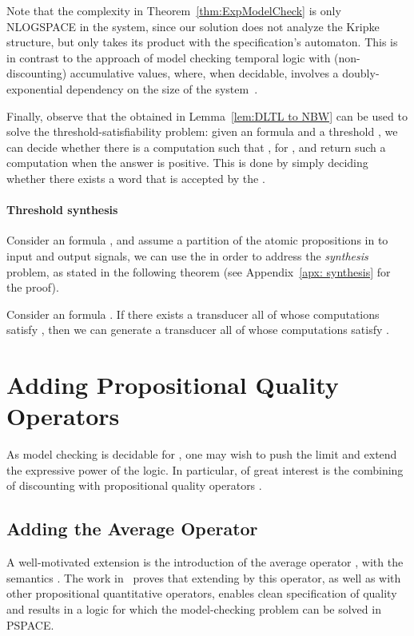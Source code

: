 \documentclass{llncs}
\begin{document}
Note that the complexity in Theorem~\ref{thm:ExpModelCheck} is 
only
NLOGSPACE in the system, since our solution does not analyze the Kripke structure, but only takes its product with the specification's automaton. This is in contrast to the approach of model checking temporal logic with (non-discounting) accumulative values, where, when decidable, involves a doubly-exponential dependency on the size of the system~\cite{BCHK11}.

Finally, observe that the  obtained in Lemma~\ref{lem:DLTL to NBW} can be used to solve the threshold-satisfiability problem: given an  formula  and a threshold , we can decide whether there is a computation  such that , for , and return such a computation when the answer is positive. This is done by simply deciding whether there exists a word that is accepted by the .


\paragraph{Threshold synthesis}
\label{rmk:SAT and synthesis}
Consider an  formula , and assume a partition of the atomic propositions in  to input and output signals, we can use the   in order to address the {\em synthesis} problem, as stated in the following theorem (see Appendix~\ref{apx: synthesis} for the proof).
\begin{theorem}
\label{thm:synthesis}
Consider an  formula . If there exists a transducer  all of whose computations  satisfy , then we can generate a transducer  all of whose computations  satisfy .
\end{theorem}




\section{Adding Propositional Quality Operators}
\label{sec:adding quality}

As model checking is decidable for , one may wish to push the limit and extend the expressive power of the logic. In particular, of great interest is the combining of discounting with propositional quality operators \cite{ABK13}.
\subsection{Adding the Average Operator}
\label{sec:average}
A well-motivated extension is the introduction of the average operator , with the semantics .
The work in~\cite{ABK13} proves that extending  by this operator, as well as with other propositional quantitative operators, enables clean specification of quality and results in a logic for which the model-checking problem can be solved in PSPACE.
\end{document}
